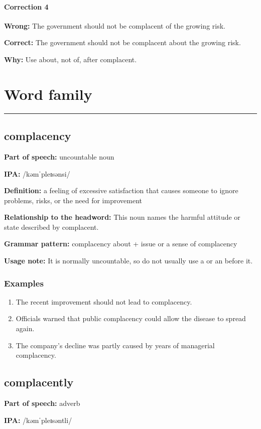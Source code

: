 \documentclass[11pt]{article}
\newcommand{\sectionrule}{\par\vspace{-0.5em}\noindent\textcolor{Accent}{\rule{\linewidth}{0.6pt}}\par}
\begin{document}
\paragraph{Correction 4}
\textbf{Wrong:} The government should not be complacent of the growing risk.

\textbf{Correct:} The government should not be complacent about the growing risk.

\textbf{Why:} Use about, not of, after complacent.

\section{Word family}
\sectionrule
\subsection{complacency}
\textbf{Part of speech:} uncountable noun

\textbf{IPA:} /kəmˈpleɪsənsi/

\textbf{Definition:} a feeling of excessive satisfaction that causes someone to ignore problems, risks, or the need for improvement

\textbf{Relationship to the headword:} This noun names the harmful attitude or state described by complacent.

\textbf{Grammar pattern:} complacency about + issue or a sense of complacency

\textbf{Usage note:} It is normally uncountable, so do not usually use a or an before it.

\subsubsection{Examples}
\begin{enumerate}
  \item The recent improvement should not lead to complacency.
  \item Officials warned that public complacency could allow the disease to spread again.
  \item The company's decline was partly caused by years of managerial complacency.
\end{enumerate}

\subsection{complacently}
\textbf{Part of speech:} adverb

\textbf{IPA:} /kəmˈpleɪsəntli/
\end{document}
